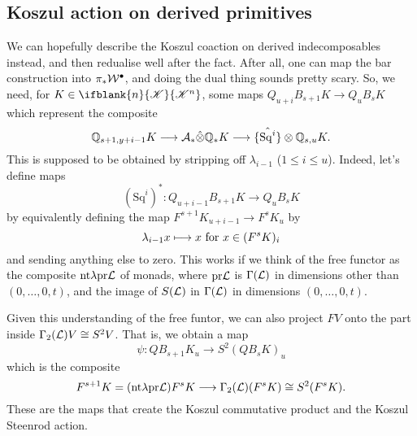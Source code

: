 \documentclass[10pt]{article}
\newcommand{\LL}[1]{\ifblank{#1}{\scrK}{\scrK^{#1}}}
\newcommand{\Sq}{\mathrm{Sq}}
\begin{document}
\begin{Koszul Actions}
\section{Koszul action on derived primitives}
We can hopefully describe the Koszul coaction on derived indecomposables instead, and then redualise well after the fact. After all, one can map the bar construction into $\pi_*\calW^\bullet$, and doing the dual thing sounds pretty scary. So, we need, for $K\in\LL{n}$, some maps $Q_{u+i}B_{s+1}K\to Q_uB_{s}K$ which represent the composite
\[\mathbb{Q}_{s+1,y+i-1}K \to\calA_*\hat\otimes\mathbb{Q}_{*}K\to \{\hat{\Sq^i}\}\otimes\mathbb{Q}_{s,u}K.\]
This is supposed to be obtained by stripping off $\lambda_{i-1}$ ($1\leq i\leq u$). Indeed, let's define maps
\[(\Sq^i)^*:Q_{u+i-1}B_{s+1}K\to Q_{u}B_{s}K\]
by equivalently defining the map $F^{s+1}K_{u+i-1}\to F^{s}K_{u}$ by
\[\lambda_{i-1}x\mapsto x\textup{ for }x\in (F^{s}K)_{i}\]
and sending anything else to zero. This works if we think of the free functor as the composite $\textup{nt$\lambda$}\circ\textup{pr$\calL$}$ of monads, where $\textup{pr$\calL$}$ is $\Gamma(\calL)$ in dimensions other than $(0,\ldots,0,t)$, and the image of $S(\calL)$ in $\Gamma(\calL)$ in dimensions $(0,\ldots,0,t)$.

Given this understanding of the free funtor, we can also project $FV$ onto the part inside $\Gamma_2(\calL)V\cong S^2V$. That is, we obtain a map
\[\psi:QB_{s+1}K_u\to S^2(QB_{s}K)_u\]
which is the composite 
\[F^{s+1}K=(\textup{nt$\lambda$}\circ\textup{pr$\calL$})F^sK \to\Gamma_2(\calL)(F^sK)\cong S^2(F^sK).\]
These are the maps that create the Koszul commutative product and the Koszul Steenrod action.


\end{Koszul Actions}
\end{document}
